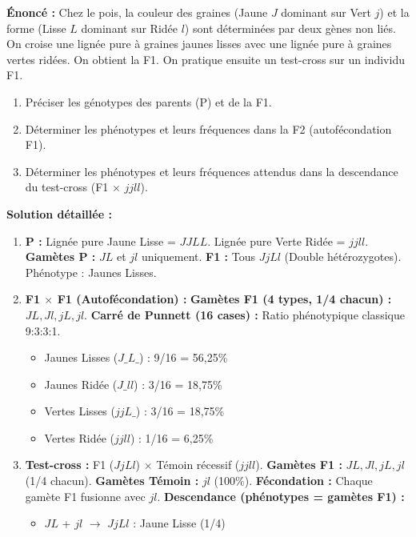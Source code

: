 \documentclass[11pt]{article}
\begin{document}
\begin{exoresolu}
    \textbf{Énoncé :} Chez le pois, la couleur des graines (Jaune $J$ dominant sur Vert $j$) et la forme (Lisse $L$ dominant sur Ridée $l$) sont déterminées par deux gènes non liés. On croise une lignée pure à graines jaunes lisses avec une lignée pure à graines vertes ridées. On obtient la F1. On pratique ensuite un test-cross sur un individu F1.
    \begin{enumerate}
        \item Préciser les génotypes des parents (P) et de la F1.
        \item Déterminer les phénotypes et leurs fréquences dans la F2 (autofécondation F1).
        \item Déterminer les phénotypes et leurs fréquences attendus dans la descendance du test-cross (F1 $\times$ $jj ll$).
    \end{enumerate}
    \tcblower
    \textbf{Solution détaillée :}
    \begin{enumerate}
        \item \textbf{P :} Lignée pure Jaune Lisse = $JJ LL$. Lignée pure Verte Ridée = $jj ll$.
        \textbf{Gamètes P :} $JL$ et $jl$ uniquement.
        \textbf{F1 :} Tous $Jj Ll$ (Double hétérozygotes). Phénotype : Jaunes Lisses.
        \item \textbf{F1 $\times$ F1 (Autofécondation) :}
        \textbf{Gamètes F1 (4 types, 1/4 chacun) :} $JL, Jl, jL, jl$.
        \textbf{Carré de Punnett (16 cases) :} Ratio phénotypique classique 9:3:3:1.
        \begin{itemize}
            \item Jaunes Lisses ($J\_ L\_$) : 9/16 = 56,25\%
            \item Jaunes Ridée ($J\_ ll$) : 3/16 = 18,75\%
            \item Vertes Lisses ($jj L\_$) : 3/16 = 18,75\%
            \item Vertes Ridée ($jj ll$) : 1/16 = 6,25\%
        \end{itemize}
        \item \textbf{Test-cross :} F1 ($Jj Ll$) $\times$ Témoin récessif ($jj ll$).
        \textbf{Gamètes F1 :} $JL, Jl, jL, jl$ (1/4 chacun).
        \textbf{Gamètes Témoin :} $jl$ (100\%).
        \textbf{Fécondation :} Chaque gamète F1 fusionne avec $jl$.
        \textbf{Descendance (phénotypes = gamètes F1) :}
        \begin{itemize}
            \item $JL$ + $jl$ $\to$ $Jj Ll$ : Jaune Lisse (1/4)

\end{itemize}
\end{enumerate}
\end{exoresolu}
\end{document}
